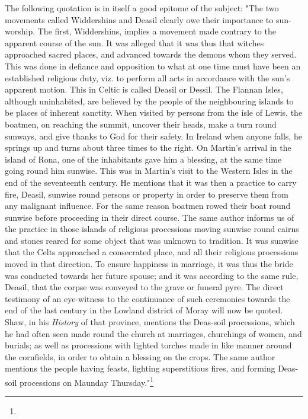 \documentclass[a4paper, 11pt, oneside, polutonikogreek, english]{article}
\begin{document}
The following quotation is in itself a good epitome of the subject: "The two movements called Widdershins and Deasil clearly owe their importance to sun-worship. The first, Widdershins, implies a movement made contrary to the apparent course of the sun. It was alleged that it was thus that witches approached sacred places, and advanced towards the demons whom they served. This was done in defiance and opposition to what at one time must have been an established religious duty, viz. to perform all acts in accordance with the sun's apparent motion. This in Celtic is called Deasil or Dessil. The Flannan Isles, although uninhabited, are believed by the people of the neighbouring islands to be places of inherent sanctity. When visited by persons from the isle of Lewis, the boatmen, on reaching the summit, uncover their heads, make a turn round sunways, and give thanks to God for their safety. In Ireland when anyone falls, he springs up and turns about three times to the right. On Martin's arrival in the island of Rona, one of the inhabitants gave him a blessing, at the same time going round him sunwise. This was in Martin's visit to the Western Isles in the end of the seventeenth century. He mentions that it was then a practice to carry fire, Deasil, sunwise round persons or property in order to preserve them from any malignant influence. For the same reason boatmen rowed their boat round sunwise before proceeding in their direct course. The same author informs us of the practice in those islands of religious processions moving sunwise round cairns and stones reared for some object that was unknown to tradition. It was sunwise that the Celts approached a consecrated place, and all their religious processions moved in that direction. To ensure happiness in marriage, it was thus the bride was conducted towards her future spouse; and it was according to the same rule, Deasil, that the corpse was conveyed to the grave or funeral pyre. The direct testimony of an eye-witness to the continuance of such ceremonies towards the end of the last century in the Lowland district of Moray will now be quoted. Shaw, in his \emph{History} of that province, mentions the Deas-soil processions, which he had often seen made round the church at marriages, churchings of women, and burials; as well as processions with lighted torches made in like manner around the cornfields, in order to obtain a blessing on the crops. The same author mentions the people having feasts, lighting superstitious fires, and forming Deas-soil processions on Maunday Thursday."\footnote{}
\end{document}

